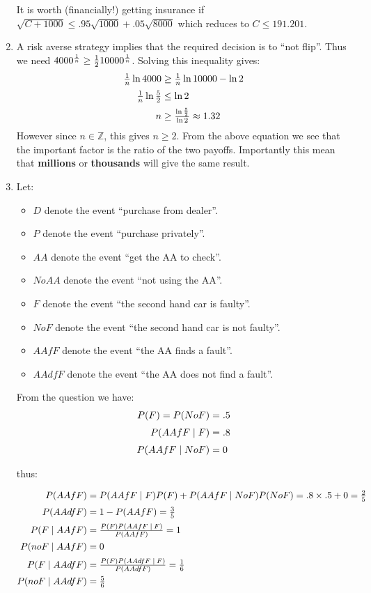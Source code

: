 \documentclass[12pt]{article}
\begin{document}
\begin{enumerate}
It is worth (financially!) getting insurance if $\sqrt{C+1000}\leq .95\sqrt{1000}+.05\sqrt{8000}$ which reduces to $C\leq191.201$.

\item A risk averse strategy implies that the required decision is to ``not flip''. Thus we need $4000^{1\over n}\geq{1\over2}10000^{1\over n}$. Solving this inequality gives:
    $$\begin{array}{@{}r@{\;}c@{\;}l@{}}
    {1\over n}\ln4000&\geq& {1\over n}\ln10000-\ln2\\[2mm]
    {1\over n}\ln{5\over2}&\leq& \ln2\\[2mm]
    n&\geq& {\ln{5\over2}\over\ln{2}}\approx1.32
    \end{array}
    $$
    However since $n\in\mathbb{Z}$, this gives $n\geq2$. From the above equation we see that the important factor is the ratio of the two payoffs. Importantly this mean that \textbf{millions} or \textbf{thousands} will give the same result.

\item
Let:

\begin{itemize}
\item $D$ denote the event ``purchase from dealer''.
\item $P$ denote the event ``purchase privately''.
\item $AA$ denote the event ``get the AA to check''.
\item $NoAA$ denote the event ``not using the AA''.
\item $F$ denote the event ``the second hand car is faulty''.
\item $NoF$ denote the event ``the second hand car is not faulty''.
\item $AAfF$ denote the event ``the AA finds a fault''.
\item $AAdfF$ denote the event ``the AA does not find a fault''.
\end{itemize}

From the question we have:
$$\begin{array}{@{}r@{\;}c@{\;}l@{}}
P(F)=P(NoF)&=&.5\\[2mm]
P(AAfF\;|\;F)&=&.8\\[2mm]
P(AAfF\;|\;NoF)&=&0\end{array}$$

thus:

$$
\begin{array}{@{}r@{\;}c@{\;}l@{}}
P(AAfF)&=&P(AAfF\;|\;F)P(F)+P(AAfF\;|\;NoF)P(NoF)=.8\times.5+0={2\over5}\\[2mm]
P(AAdfF)&=&1-P(AAfF)={3\over5}\\[2mm]
P(F\;|\;AAfF)&=&{P(F)P(AAfF\;|\:F)\over P(AAfF)}=1\\[2mm]
P(noF\;|\;AAfF)&=&0\\[2mm]
P(F\;|\;AAdfF)&=&{P(F)P(AAdfF\;|\:F)\over P(AAdfF)}={1\over6}\\[2mm]
P(noF\;|\;AAdfF)&=&{5\over6}
\end{array}$$



\end{enumerate}
\end{document}
